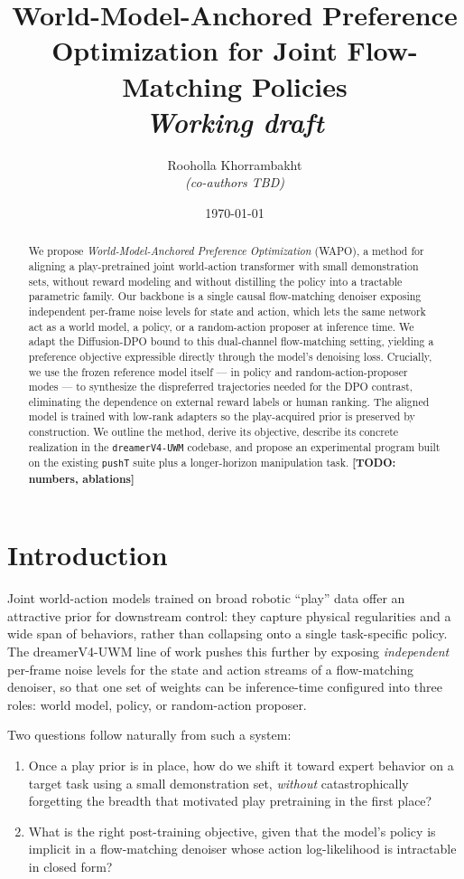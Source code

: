 \documentclass[11pt]{article}
\title{World-Model-Anchored Preference Optimization for Joint Flow-Matching Policies\\
\large \emph{Working draft}}
\author{Rooholla Khorrambakht \\ \emph{(co-authors TBD)}}
\date{\today}
\newcommand{\todo}[1]{\textbf{[TODO: #1]}}
\begin{document}
\maketitle

\begin{abstract}
We propose \emph{World-Model-Anchored Preference Optimization} (WAPO), a method for aligning a play-pretrained joint world-action transformer with small demonstration sets, without reward modeling and without distilling the policy into a tractable parametric family. Our backbone is a single causal flow-matching denoiser exposing independent per-frame noise levels for state and action, which lets the same network act as a world model, a policy, or a random-action proposer at inference time. We adapt the Diffusion-DPO bound to this dual-channel flow-matching setting, yielding a preference objective expressible directly through the model's denoising loss. Crucially, we use the frozen reference model itself --- in policy and random-action-proposer modes --- to synthesize the dispreferred trajectories needed for the DPO contrast, eliminating the dependence on external reward labels or human ranking. The aligned model is trained with low-rank adapters so the play-acquired prior is preserved by construction. We outline the method, derive its objective, describe its concrete realization in the \texttt{dreamerV4-UWM} codebase, and propose an experimental program built on the existing \texttt{pushT} suite plus a longer-horizon manipulation task. \todo{numbers, ablations}
\end{abstract}

\section{Introduction}
\label{sec:intro}

Joint world-action models trained on broad robotic ``play'' data offer an attractive prior for downstream control: they capture physical regularities and a wide span of behaviors, rather than collapsing onto a single task-specific policy. The dreamerV4-UWM line of work pushes this further by exposing \emph{independent} per-frame noise levels for the state and action streams of a flow-matching denoiser, so that one set of weights can be inference-time configured into three roles: world model, policy, or random-action proposer.

Two questions follow naturally from such a system:

\begin{enumerate}
    \item Once a play prior is in place, how do we shift it toward expert behavior on a target task using a small demonstration set, \emph{without} catastrophically forgetting the breadth that motivated play pretraining in the first place?
    \item What is the right post-training objective, given that the model's policy is implicit in a flow-matching denoiser whose action log-likelihood is intractable in closed form?
\end{enumerate}
\end{document}
